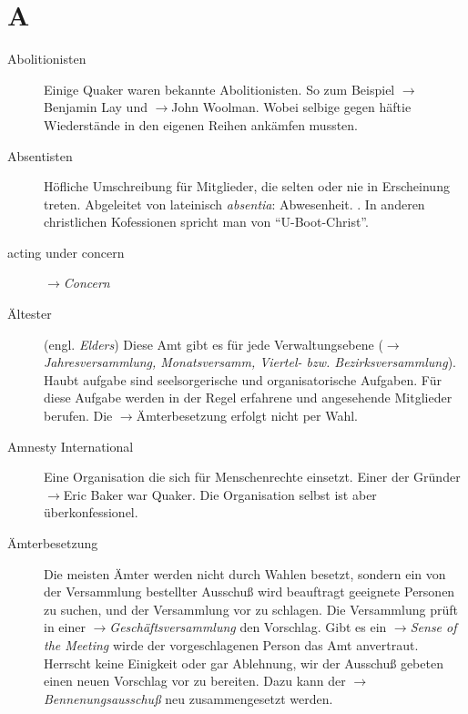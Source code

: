 \section*{A}

\articlesize
\begin{description}

 \item[Abolitionisten] Einige Quaker waren bekannte Abolitionisten. So zum
Beispiel $\to$Benjamin Lay und $\to$John Woolman. Wobei selbige gegen häftie
Wiederstände in den eigenen Reihen ankämfen mussten.

 \item[Absentisten] Höfliche Umschreibung für Mitglieder, die selten oder nie
 in Erscheinung treten. Abgeleitet von lateinisch \textit{absentia}: Abwesenheit.
 .
 In anderen christlichen Kofessionen spricht man von "`U-Boot-Christ"'.

 \item[acting under concern] $\to$\textit{Concern}

 \item[Ältester] (engl. \textit{Elders}) Diese Amt gibt es für jede Verwaltungsebene
($\to$\textit{Jahresversammlung, Monatsversamm, Viertel- bzw.
Bezirksversammlung}). Haubt aufgabe sind seelsorgerische und organisatorische
Aufgaben. Für diese Aufgabe werden in der Regel erfahrene und angesehende
Mitglieder berufen. Die $\to$Ämterbesetzung erfolgt nicht per Wahl.

 \item[Amnesty International] Eine Organisation die sich für Menschenrechte
einsetzt. Einer der Gründer $\to$Eric Baker war Quaker. Die Organisation selbst
ist aber überkonfessionel.

 \item[Ämterbesetzung]  Die meisten Ämter werden nicht durch Wahlen besetzt,
sondern ein von der Versammlung bestellter Ausschuß wird beauftragt geeignete
Personen zu suchen, und der Versammlung vor zu schlagen. Die Versammlung prüft
in einer $\to$\textit{Geschäftsversammlung} den Vorschlag. Gibt es ein
$\to$\textit{Sense of the Meeting} wirde der vorgeschlagenen Person das Amt
anvertraut. Herrscht keine Einigkeit oder gar Ablehnung, wir der Ausschuß
gebeten einen neuen Vorschlag vor zu bereiten. Dazu kann der
$\to$\textit{Bennenungsausschuß} neu zusammengesetzt werden.


\end{description}
